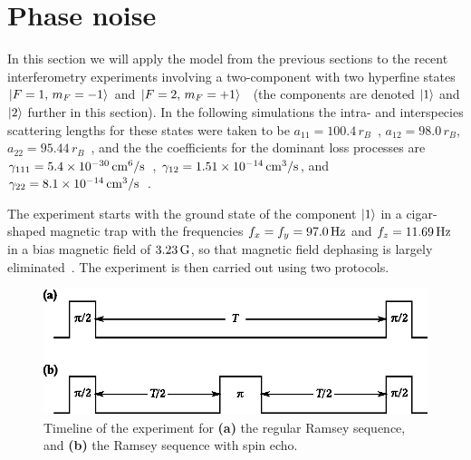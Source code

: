 \section{Phase noise}

In this section we will apply the model from the previous sections to the recent interferometry experiments involving a two-component \Rb{}  with two hyperfine states ${\mbox{\ensuremath{\vert F=1,\, m_F=-1 \rangle}}}$ and ${\mbox{\ensuremath{\vert F=2,\, m_F=+1 \rangle}}}$~\cite{Egorov2011} (the components are denoted $\mbox{\ensuremath{\vert 1 \rangle}}$ and $\mbox{\ensuremath{\vert 2 \rangle}}$ further in this section).
In the following simulations the intra- and interspecies scattering lengths for these states were taken to be $a_{11} = 100.4\,r_B$~\cite{Widera2006,Mertes2007}, $a_{12} = 98.0\,r_B$, $a_{22} = 95.44\,r_B$~\cite{Egorov2013}, and the the coefficients for the dominant loss processes are $\gamma_{111} = 5.4 \times 10^{-30} \mbox{\ensuremath{\,\mathrm{cm^6/s}}}$~\cite{Mertes2007}, $\gamma_{12} = 1.51 \times 10^{-14}\mbox{\ensuremath{\,\mathrm{cm^3/s}}}$, and $\gamma_{22} = 8.1 \times 10^{-14} \mbox{\ensuremath{\,\mathrm{cm^3/s}}}$~\cite{Egorov2013}.

The experiment starts with the ground state of the component $\mbox{\ensuremath{\vert 1 \rangle}}$ in a cigar-shaped magnetic trap with the frequencies $f_x = f_y = 97.0\mbox{\ensuremath{\,\mathrm{Hz}}}$ and $f_z = 11.69\mbox{\ensuremath{\,\mathrm{Hz}}}$ in a bias magnetic field of $3.23\mbox{\ensuremath{\,\mathrm{G}}}$, so that magnetic field dephasing is largely eliminated~\cite{Hall1998}.
The experiment is then carried out using two protocols.

\begin{figure}
    \centerline{\includegraphics{figures_precreated/sequences.eps}}
    \caption{
    Timeline of the experiment for \textbf{(a)} the regular Ramsey sequence, and \textbf{(b)} the Ramsey sequence with spin echo.}
    \label{fig:bec-noise:phase-noise:sequences}
\end{figure}

